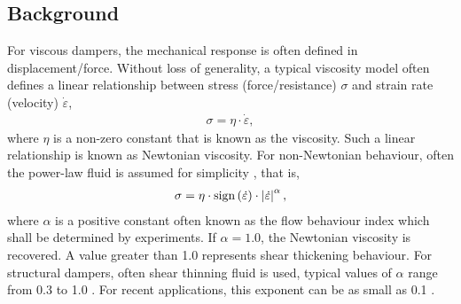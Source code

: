 \subsection{Background}
For viscous dampers, the mechanical response is often defined in displacement/force. Without loss of generality, a typical viscosity model often defines a linear relationship between stress (force/resistance) $\sigma$ and strain rate (velocity) $\dot{\varepsilon}$,
\begin{gather}
\sigma=\eta\cdot\dot{\varepsilon},
\end{gather}
where $\eta$ is a non-zero constant that is known as the viscosity. Such a linear relationship is known as Newtonian viscosity. For non-Newtonian behaviour, often the power-law fluid is assumed for simplicity \citep[see, e.g.,][]{Wu2016}, that is,
\begin{gather}
\sigma=\eta\cdot\mathrm{sign}\left(\dot{\varepsilon}\right)\cdot\left\lvert\dot{\varepsilon}\right\rvert^{\alpha},
\end{gather}
where $\alpha$ is a positive constant often known as the flow behaviour index which shall be determined by experiments. If $\alpha=1.0$, the Newtonian viscosity is recovered. A value greater than \num{1.0} represents shear thickening behaviour. For structural dampers, often shear thinning fluid is used, typical values of $\alpha$ range from \num{0.3} to \num{1.0} \citep{Lee2001}. For recent applications, this exponent can be as small as \num{0.1} \citep[see][pg. 133]{Lago2018}.
